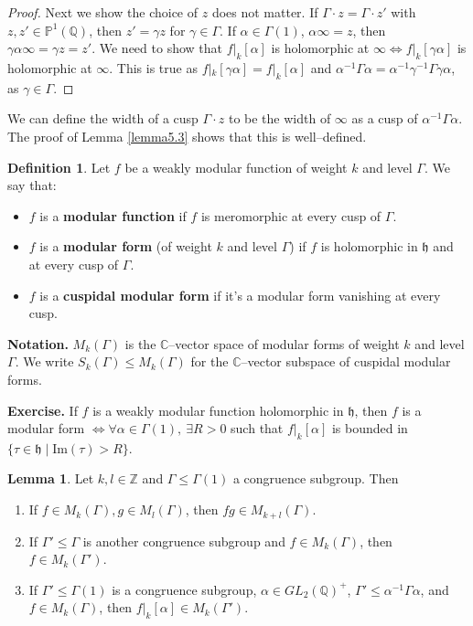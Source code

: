 \documentclass{article}
\theoremstyle{definition}
\newtheorem{lemma}[theorem]{Lemma}
\newtheorem{defn}{Definition}[section]
\begin{document}
\begin{proof}
    Next we show the choice of $z$ does not matter. If $\Gamma\cdot z= \Gamma\cdot z'$ with $z, z' \in \mathbb{P}^1(\mathbb{Q})$, then $z' = \gamma z$ for $\gamma \in \Gamma$. If $\alpha \in \Gamma(1)$, $\alpha \infty = z$, then $\gamma \alpha \infty = \gamma z = z'$. We need to show that $f|_k[\alpha]$ is holomorphic at $\infty \iff f|_k[\gamma \alpha]$ is holomorphic at $\infty$. This is true as $f|_k[\gamma \alpha] = f|_k[\alpha]$ and $\alpha ^{-1} \Gamma \alpha = \alpha^{-1}\gamma^{-1}\Gamma \gamma \alpha$, as $\gamma \in \Gamma$. 
\end{proof}
We can define the width of a cusp $\Gamma \cdot z$ to be the width of $\infty$ as a cusp of $\alpha^{-1} \Gamma \alpha$. The proof of Lemma \ref{lemma5.3} shows that this is well--defined.
\begin{defn}
    Let $f$ be a weakly modular function of weight $k$ and level $\Gamma$. We say that:
    \begin{itemize}
        \item $f$ is a \textbf{modular function} if $f$ is meromorphic at every cusp of $\Gamma$.
        \item $f$ is a \textbf{modular form} (of weight $k$ and level $\Gamma$) if $f$ is holomorphic in $\mathfrak{h}$ and at every cusp of $\Gamma$.
        \item $f$ is a \textbf{cuspidal modular form} if it's a modular form vanishing at every cusp.
    \end{itemize}
\end{defn}
\textbf{Notation.} $M_k(\Gamma)$ is the $\mathbb{C}$--vector space of modular forms of weight $k$ and level $\Gamma$. We write $S_k(\Gamma) \le M_k(\Gamma)$ for the $\mathbb{C}$--vector subspace of cuspidal modular forms.
\vspace{1mm}
 
\textbf{Exercise.} If $f$ is a weakly modular function holomorphic in $\mathfrak{h}$, then $f$ is a modular form $\iff \forall \alpha \in \Gamma(1), ~\exists R>0$ such that $f|_k[\alpha]$ is bounded in $\{\tau \in \mathfrak{h} \mid \text{Im}(\tau)>R\}$.

\begin{lemma}
    Let $k,l \in \mathbb{Z}$ and $\Gamma\le \Gamma(1)$ a congruence subgroup. Then 
    \begin{enumerate}[(1)]
        \item If $f \in M_k(\Gamma), g \in M_l(\Gamma)$, then $fg \in M_{k+l}(\Gamma)$.
        \item If $\Gamma'\le \Gamma$ is another congruence subgroup and $f \in M_k(\Gamma)$, then $f \in M_k(\Gamma')$.
        \item If $\Gamma'\le \Gamma(1)$ is a congruence subgroup, $\alpha \in GL_2(\mathbb{Q})^+$, $\Gamma' \le \alpha^{-1} \Gamma \alpha$, and $f \in M_k(\Gamma)$, then $f|_k[\alpha] \in M_k(\Gamma')$.
    \end{enumerate}    
\end{lemma}
\end{document}
